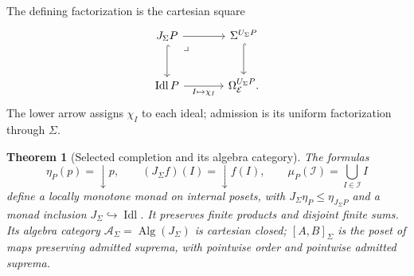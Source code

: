 \documentclass[11pt,a4paper]{article}
\numberwithin{algorithm}{section}
\numberwithin{equation}{section}
\newtheorem{theorem}{Theorem}[section]
\theoremstyle{definition}
\theoremstyle{remark}
\theoremstyle{plain}
\newcommand{\E}{\mathcal E}
\newcommand{\Truth}{\Omega_{\E}}
\newcommand{\Idl}{\operatorname{Idl}}
\newcommand{\AS}{\mathcal A_{\Sigma}}
\newcommand{\J}{J_{\Sigma}}
\newcommand{\incl}{\hookrightarrow}
\theoremstyle{definition}
\theoremstyle{plain}
\begin{document}
The defining factorization is the cartesian square
\[
\begin{tikzcd}[column sep=large,row sep=large]
 \J P \arrow[dr,phantom,"\lrcorner",very near start] \arrow[r] \arrow[d,hook]
   & \Sigma^{U_\Sigma P} \arrow[d,hook]\\
 \Idl P \arrow[r,"{I\mapsto\chi_I}"']
   & \Truth^{U_\Sigma P}.
\end{tikzcd}
\]
The lower arrow assigns $\chi_I$ to each ideal; admission
is its uniform factorization through $\Sigma$.


\begin{theorem}[Selected completion and its algebra category]
\label{thm:standalone-domain}
The formulas
\[
 \eta_P(p)=\downarrow p,\qquad
 (\J f)(I)=\downarrow f(I),\qquad
 \mu_P(\mathcal I)=\bigcup_{I\in\mathcal I}I
\]
define a locally monotone monad on internal posets, with
$\J\eta_P\le\eta_{\J P}$ and a monad inclusion $\J\incl\Idl$.
It preserves finite products and disjoint finite sums.
Its algebra category $\AS=\operatorname{Alg}(\J)$ is cartesian closed;
$[A,B]_\Sigma$ is the poset of maps preserving admitted suprema,
with pointwise order and pointwise admitted suprema.
\end{theorem}
\end{document}
